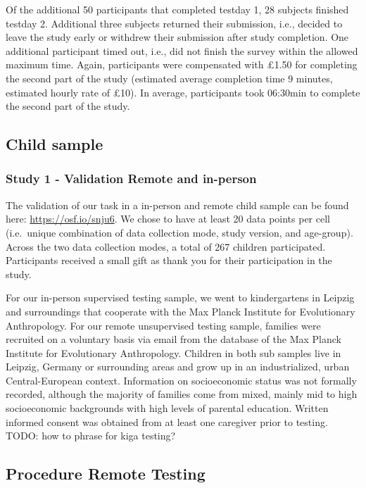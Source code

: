 \documentclass[
  english,
  man,floatsintext]{apa6}
\begin{document}
Of the additional 50 participants that completed testday 1, 28 subjects finished testday 2. Additional three subjects returned their submission, i.e., decided to leave the study early or withdrew their submission after study completion. One additional participant timed out, i.e., did not finish the survey within the allowed maximum time. Again, participants were compensated with £1.50 for completing the second part of the study (estimated average completion time 9 minutes, estimated hourly rate of £10). In average, participants took 06:30min to complete the second part of the study.

\hypertarget{child-sample}{%
\subsection{Child sample}\label{child-sample}}

\hypertarget{study-1---validation-remote-and-in-person}{%
\subsubsection{Study 1 - Validation Remote and in-person}\label{study-1---validation-remote-and-in-person}}

The validation of our task in a in-person and remote child sample can be found here: \url{https://osf.io/snju6}.
We chose to have at least 20 data points per cell (i.e.~unique combination of data collection mode, study version, and age-group). Across the two data collection modes, a total of 267 children participated. Participants received a small gift as thank you for their participation in the study.

For our in-person supervised testing sample, we went to kindergartens in Leipzig and surroundings that cooperate with the Max Planck Institute for Evolutionary Anthropology. For our remote unsupervised testing sample, families were recruited on a voluntary basis via email from the database of the Max Planck Institute for Evolutionary Anthropology. Children in both sub samples live in Leipzig, Germany or surrounding areas and grow up in an industrialized, urban Central-European context. Information on socioeconomic status was not formally recorded, although the majority of families come from mixed, mainly mid to high socioeconomic backgrounds with high levels of parental education.
Written informed consent was obtained from at least one caregiver prior to testing.
TODO: how to phrase for kiga testing?

\hypertarget{procedure-remote-testing}{%
\subsection{Procedure Remote Testing}\label{procedure-remote-testing}}
\end{document}
